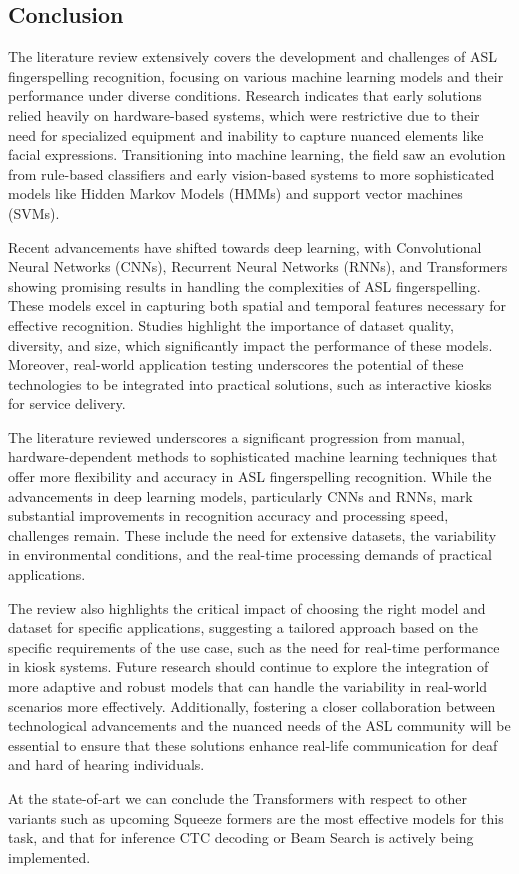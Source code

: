 \subsection{Conclusion}

The literature review extensively covers the development and challenges of ASL fingerspelling recognition, focusing on various machine learning models and their performance under diverse conditions. Research indicates that early solutions relied heavily on hardware-based systems, which were restrictive due to their need for specialized equipment and inability to capture nuanced elements like facial expressions. Transitioning into machine learning, the field saw an evolution from rule-based classifiers and early vision-based systems to more sophisticated models like Hidden Markov Models (HMMs) and support vector machines (SVMs).

Recent advancements have shifted towards deep learning, with Convolutional Neural Networks (CNNs), Recurrent Neural Networks (RNNs), and Transformers showing promising results in handling the complexities of ASL fingerspelling. These models excel in capturing both spatial and temporal features necessary for effective recognition. Studies highlight the importance of dataset quality, diversity, and size, which significantly impact the performance of these models. Moreover, real-world application testing underscores the potential of these technologies to be integrated into practical solutions, such as interactive kiosks for service delivery.

The literature reviewed underscores a significant progression from manual, hardware-dependent methods to sophisticated machine learning techniques that offer more flexibility and accuracy in ASL fingerspelling recognition. While the advancements in deep learning models, particularly CNNs and RNNs, mark substantial improvements in recognition accuracy and processing speed, challenges remain. These include the need for extensive datasets, the variability in environmental conditions, and the real-time processing demands of practical applications.

The review also highlights the critical impact of choosing the right model and dataset for specific applications, suggesting a tailored approach based on the specific requirements of the use case, such as the need for real-time performance in kiosk systems. Future research should continue to explore the integration of more adaptive and robust models that can handle the variability in real-world scenarios more effectively. Additionally, fostering a closer collaboration between technological advancements and the nuanced needs of the ASL community will be essential to ensure that these solutions enhance real-life communication for deaf and hard of hearing individuals.

At the state-of-art we can conclude the Transformers with respect to other variants such as upcoming Squeeze formers are the most effective models for this task, and that for inference CTC decoding or Beam Search is actively being implemented.